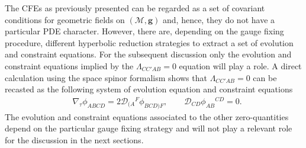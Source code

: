 \documentclass[10pt,a4paper]{article}
\theoremstyle{plain}
\def\bmg{{\bm g}}
\begin{document}
{The CFEs as previously presented can be regarded as a set of covariant
conditions for geometric fields on $(\mathcal{M},\bmg)$ and, hence, they do
not have a particular PDE character.  However, there are, depending on
the gauge fixing procedure, different hyperbolic reduction strategies
to extract a set of evolution and constraint equations.
For the subsequent discussion only the evolution and constraint equations
implied by the $\Lambda_{CC'AB}=0$ equation will play a role.
A direct calculation using the space spinor formalism shows that
$\Lambda_{CC'AB}=0$ can be recasted as the following system of evolution equation and
constraint equations
\begin{align}\label{RescaledWeyl_evo_const}
  & \nabla_\tau \phi _{ABCD} =  2 \mathcal{D} _{(A}{}^{F}\phi _{BCD)F}, %
  \qquad \mathcal{D} _{CD}\phi _{AB}{}^{CD} = 0. 
\end{align}
The evolution and constraint equations associated to the
other zero-quantities depend on the particular gauge fixing strategy
and will not play a relevant role for the discussion in the next sections.

\medskip

}
\end{document}
